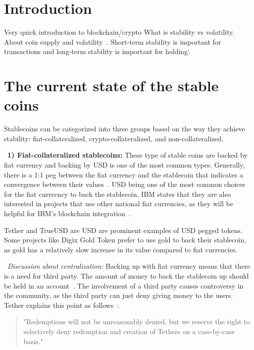 \section{Introduction}
Very quick introduction to blockchain/crypto
What is stability vs volatility.
About coin supply and volatility~\cite{sams2015note}.
Short-term stability is important for transactions and long-term stability is important for holding`\cite{forbes}.


\section{The current state of the stable coins} %

Stablecoins can be categorized into three groups based on the way they achieve stability: fiat-collateralized, crypto-collateralized, and non-collateralized.

~\textbf{1) Fiat-collateralized stablecoins:} These type of stable coins are backed by fiat currency and backing by USD is one of the most common types. Generally, there is a 1:1 peg between the fiat currency and the stablecoin that indicates a convergence between their values~\cite{linkedin}. USD being one of the most common choices for the fiat currecncy to back the stablecoin, IBM states that they are also interested in projects that use other national fiat currencies, as they will be helpful for IBM's blockchain integration~\cite{cointelegraph}.

Tether and TrueUSD are USD are prominent examples of USD pegged tokens. Some projects like Digix Gold Token prefer to use gold to back their stablecoin, as gold has a relatively slow increase in its value compared to fiat currencies. %

~\textit{Discussion about centralization:} Backing up with fiat currency means that there is a need for third party. The amount of money to back the stablecoin up should be held in an account~\cite{techrev}. The involvement of a third party causes controversy in the community, as the third party can just deny giving money to the users. Tether explains this point as follows~\cite{cryptoinsider}:

\begin{quote}
"Redemptions will not be unreasonably denied, but we reserve the right to selectively deny redemption and creation of Tethers on a case-by-case basis."
\end{quote}

